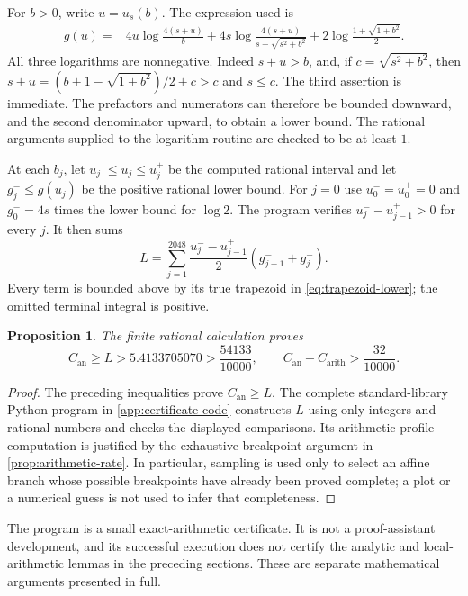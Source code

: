 \documentclass[11pt,letterpaper]{article}
\newtheorem{proposition}[proposition]{Proposition}
\theoremstyle{definition}
\newcommand{\arith}{\mathrm{arith}}
\newcommand{\an}{\mathrm{an}}
\begin{document}
For $b>0$, write $u=u_s(b)$. The expression used is
\begin{align}
 g(u)={}&4u\log\frac{4(s+u)}b
  +4s\log\frac{4(s+u)}{s+\sqrt{s^2+b^2}}
  +2\log\frac{1+\sqrt{1+b^2}}2.\label{eq:g-positive}
\end{align}
All three logarithms are nonnegative. Indeed $s+u>b$, and, if
$c=\sqrt{s^2+b^2}$, then
$s+u=(b+1-\sqrt{1+b^2})/2+c>c$ and $s\le c$.
The third assertion is immediate.
The prefactors and numerators can therefore be bounded downward, and
the second denominator upward, to obtain a lower bound.
The rational arguments supplied to the logarithm routine are checked
to be at least $1$.

At each $b_j$, let $u_j^-\le u_j\le u_j^+$ be the computed rational
interval and let $g_j^-\le g(u_j)$ be the positive rational lower bound.
For $j=0$ use $u_0^-=u_0^+=0$ and
$g_0^-=4s$ times the lower bound for $\log2$.
The program verifies $u_j^--u_{j-1}^+>0$ for every $j$.
It then sums
\begin{equation}\label{eq:rational-trapezoids}
 L=\sum_{j=1}^{2048}
   \frac{u_j^- -u_{j-1}^+}{2}(g_{j-1}^-+g_j^-).
\end{equation}
Every term is bounded above by its true trapezoid in
\eqref{eq:trapezoid-lower}; the omitted terminal integral is positive.

\begin{proposition}\label{prop:exact-gap}
The finite rational calculation proves
\[
 C_{\an}\ge L>5.4133705070>\frac{54133}{10000},
 \qquad
 C_{\an}-C_{\arith}>\frac{32}{10000}.
\]
\end{proposition}
\begin{proof}
The preceding inequalities prove $C_{\an}\ge L$. The complete
standard-library Python program in \cref{app:certificate-code} constructs
$L$ using only integers and rational numbers and checks the displayed
comparisons. Its arithmetic-profile computation is justified by the
exhaustive breakpoint argument in \cref{prop:arithmetic-rate}.
In particular, sampling is used only to select an affine branch whose
possible breakpoints have already been proved complete; a plot or a
numerical guess is not used to infer that completeness.
\end{proof}

The program is a small exact-arithmetic certificate. It is not a
proof-assistant development, and its successful execution does not
certify the analytic and local-arithmetic lemmas in the preceding
sections. These are separate mathematical arguments presented in full.
\end{document}
